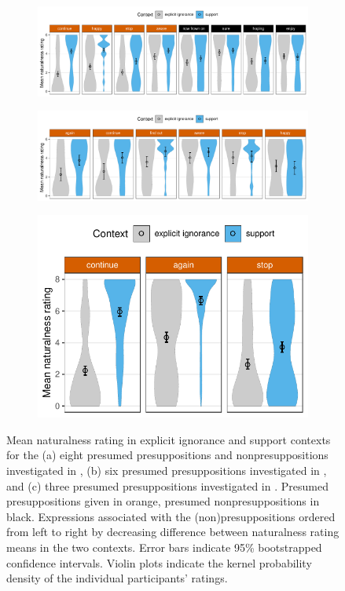 \documentclass[11pt,fleqn]{article}
\newcommand{\6}{\mbox{$[\hspace*{-.6mm}[$}}
\newcommand{\9}{\mbox{$]\hspace*{-.6mm}]$}}
\begin{document}
\begin{figure}[h!]
\centering
\begin{subfigure}{1\textwidth}
\centering
\includegraphics[width=.9\textwidth]{../../../mandelkern-etal2020/graphs/naturalness-by-context-and-expression}
\caption{\citealt[Exp.~3]{mandelkern-etal2020}}
\end{subfigure}

\begin{subfigure}{1\textwidth}
\centering
\includegraphics[width=.9\textwidth]{../../../kalomoiros-schwarz2024/exp1/graphs/naturalness-by-context-and-expression} 
\caption{\citealt[Exp.~1]{kalomoiros-schwarz2024}}
\end{subfigure}

\begin{subfigure}{1\textwidth}
\centering
\includegraphics[width=.37\textwidth]{../../../kalomoiros-schwarz2024/exp2/graphs/naturalness-by-context-and-expression}
\caption{\citealt[Exp.~2]{kalomoiros-schwarz2024}}
\end{subfigure}

\caption{Mean naturalness rating in explicit ignorance and support contexts for the (a)  eight presumed presuppositions and nonpresuppositions investigated in \citealt[Exp.~3]{mandelkern-etal2020}, (b) six presumed presuppositions investigated in \citealt[Exp.~1]{kalomoiros-schwarz2024}, and (c) three presumed presuppositions investigated in \citealt[Exp.~2]{kalomoiros-schwarz2024}. Presumed presuppositions given in orange, presumed nonpresuppositions in black. Expressions associated with the (non)presuppositions ordered from left to right by decreasing difference between naturalness rating means in the two contexts. Error bars indicate 95\% bootstrapped confidence intervals. Violin plots indicate the kernel probability density of the individual participants' ratings.}\label{fig:both-contexts}
\end{figure}
\end{document}
